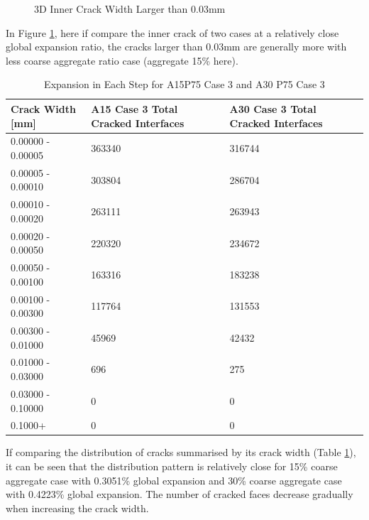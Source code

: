 \begin{figure}[!h]
  \caption{3D Inner Crack Width Larger than 0.03mm}
  \label{fig:ASR_A15P75_crack}
\end{figure}

In Figure \ref{fig:ASR_A15P75_crack}, here if compare the inner crack of two cases at a relatively close global expansion ratio, the cracks larger than 0.03mm are generally more with less coarse aggregate ratio case (aggregate 15\% here).



\begin{table}[!h]
\centering
\begin{tabular}{ ||p{4cm}|p{4cm}|p{4cm}|| }
\hline
 Crack Width [mm] &  A15 Case 3 Total Cracked Interfaces &  A30 Case 3 Total Cracked Interfaces \\
 \hline\hline

   0.00000 - 0.00005 & 363340 & 316744 \\
   0.00005 - 0.00010 & 303804 & 286704 \\
   0.00010 - 0.00020 & 263111 & 263943 \\
   0.00020 - 0.00050 & 220320 & 234672 \\
   0.00050 - 0.00100 & 163316 & 183238 \\
   0.00100 - 0.00300 & 117764 & 131553 \\
   0.00300 - 0.01000 & 45969 & 42432 \\
   0.01000 - 0.03000 & 696 & 275 \\
   0.03000 - 0.10000 & 0 & 0 \\
   0.1000+ & 0 & 0 \\

  \hline
  \end{tabular}
\caption{Expansion in Each Step for A15P75 Case 3 and A30 P75 Case 3}
\label{table:A15vsA30P75_3_Cracks}
\end{table}


If comparing the distribution of cracks summarised by its crack width (Table \ref{table:A15vsA30P75_3_Cracks}),  it can be seen that the distribution pattern is relatively close for 15\% coarse aggregate case with 0.3051\% global expansion and  30\% coarse aggregate case with 0.4223\% global expansion.  The number of cracked faces decrease gradually when increasing the crack width.

